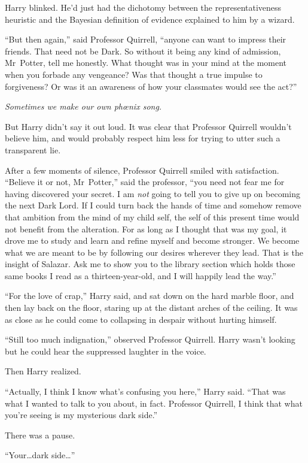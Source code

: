 Harry blinked. He’d just had the dichotomy between the representativeness heuristic and the Bayesian definition of evidence explained to him by a wizard.

“But then again,” said Professor Quirrell, “anyone can want to impress their friends. That need not be Dark. So without it being any kind of admission, Mr~Potter, tell me honestly. What thought was in your mind at the moment when you forbade any vengeance? Was that thought a true impulse to forgiveness? Or was it an awareness of how your classmates would see the act?”

\emph{Sometimes we make our own phœnix song.}

But Harry didn’t say it out loud. It was clear that Professor Quirrell wouldn’t believe him, and would probably respect him less for trying to utter such a transparent lie.

After a few moments of silence, Professor Quirrell smiled with satisfaction.
“Believe it or not, Mr~Potter,” said the professor, “you need not fear me for having discovered your secret. I am \emph{not} going to tell you to give up on becoming the next Dark Lord. If I could turn back the hands of time and somehow remove that ambition from the mind of my child self, the self of this present time would not benefit from the alteration. For as long as I thought that was my goal, it drove me to study and learn and refine myself and become stronger. We become what we are meant to be by following our desires wherever they lead. That is the insight of Salazar. Ask me to show you to the library section which holds those same books I read as a thirteen-year-old, and I will happily lead the way.”

“For the love of crap,” Harry said, and sat down on the hard marble floor, and then lay back on the floor, staring up at the distant arches of the ceiling. It was as close as he could come to collapsing in despair without hurting himself.

“Still too much indignation,” observed Professor Quirrell. Harry wasn’t looking but he could hear the suppressed laughter in the voice.

Then Harry realized.

“Actually, I think I know what’s confusing you here,” Harry said.
“That was what I wanted to talk to you about, in fact. Professor Quirrell, I think that what you’re seeing is my mysterious dark side.”

There was a pause.

“Your…dark side…”

